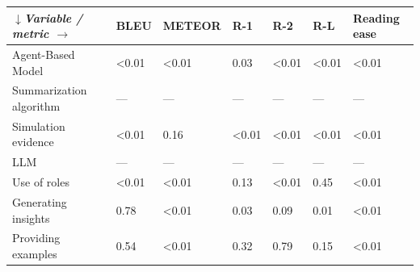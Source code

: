 \begin{tabular}{|l|l|l|l|l|l|l|}
\hline
\textit{$\downarrow$Variable / metric $\rightarrow$} & BLEU & METEOR & R-1 & R-2 & R-L & Reading ease \\
 \hline
 Agent-Based Model & \textless{}0.01 & \textless{}0.01 & 0.03 & \textless{}0.01 & \textless{}0.01 & \textless{}0.01 \\
 \hline
 Summarization algorithm & — & — & — & — & — & — \\
 \hline
 Simulation evidence & \textless{}0.01 & 0.16 & \textless{}0.01 & \textless{}0.01 & \textless{}0.01 & \textless{}0.01 \\
 \hline
 LLM & — & — & — & — & — & — \\
 \hline
 Use of roles & \textless{}0.01 & \textless{}0.01 & 0.13 & \textless{}0.01 & 0.45 & \textless{}0.01 \\
 \hline
 Generating insights & 0.78 & \textless{}0.01 & 0.03 & 0.09 & 0.01 & \textless{}0.01 \\
 \hline
 Providing examples & 0.54 & \textless{}0.01 & 0.32 & 0.79 & 0.15 & \textless{}0.01 \\
\hline
\end{tabular}
